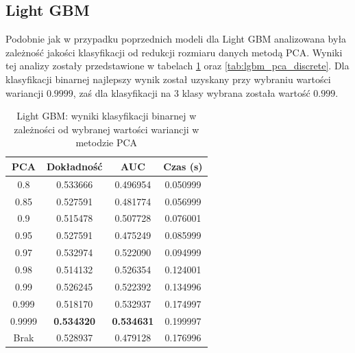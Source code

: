 \documentclass[a4paper, twoside, 11pt, openright]{article}
\begin{document}
\subsection{Light GBM}

Podobnie jak w przypadku poprzednich modeli dla Light GBM analizowana była zależność jakości klasyfikacji od redukcji rozmiaru danych metodą PCA. Wyniki tej analizy zostały przedstawione w tabelach \ref{tab:lgbm_pca_binary} oraz \ref{tab:lgbm_pca_discrete}. Dla klasyfikacji binarnej najlepszy wynik został uzyskany przy wybraniu wartości wariancji $0.9999$, zaś dla klasyfikacji na 3 klasy wybrana została wartość $0.999$.	

\begin{table}[H]
    \centering
    \begin{tabular}{|c|c|c|c|}
    \hline
        \textbf{PCA} & \textbf{Dokładność} & \textbf{AUC} & \textbf{Czas (s)} \\ \hline
0.8                &  0.533666 &  0.496954 &    0.050999 \\ \hline
0.85               &  0.527591 &  0.481774 &    0.056999 \\ \hline
0.9                &  0.515478 &  0.507728 &    0.076001 \\ \hline
0.95               &  0.527591 &  0.475249 &    0.085999 \\ \hline
0.97               &  0.532974 &  0.522090 &    0.094999 \\ \hline
0.98               &  0.514132 &  0.526354 &    0.124001 \\ \hline
0.99               &  0.526245 &  0.522392 &    0.134996 \\ \hline
0.999			   &  0.518170 &  0.532937 &    0.174997 \\ \hline
0.9999             &  \textbf{0.534320} &  \textbf{0.534631} &    0.199997 \\ \hline
Brak                &  0.528937 &  0.479128 &    0.176996 \\ \hline
    \end{tabular}
    \caption{Light GBM: wyniki klasyfikacji binarnej w zależności od wybranej wartości wariancji w metodzie PCA}
    \label{tab:lgbm_pca_binary}
\end{table}
\end{document}
